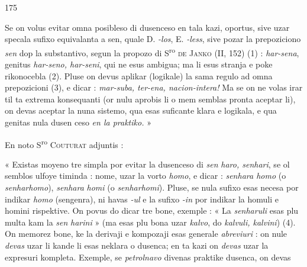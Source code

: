 \begin{VUpage}[179]{175}

Se on volus evitar omna posibleso di dusenceso en tala\nl
kazi, oportus, sive uzar specala sufixo equivalanta a sen,\nl
quale D. \textit{-los}, E. \textit{-less}, sive pozar la prepoziciono \textit{sen} dop la\nl
substantivo, segun la propozo di S\textsuperscript{ro} \textsc{de Janko} (II, 152) (1) :\nl
\textit{har-sena}, genitus \textit{har-seno, har-seni}, qui ne esus ambigua;\nl
ma li esus stranja e poke rikonocebla (2). Pluse on devus\nl
aplikar (logikale) la sama regulo ad omna prepozicioni (3),\nl
e dicar : \textit{mar-suba, ter-ena, nacion-intera!} Ma se on ne volas\nl
irar til ta extrema konsequanti (or nulu aprobis li o mem\nl
semblas pronta aceptar li), on devas aceptar la nuna sistemo,\nl
qua esas suficante klara e logikala, e qua genitas nula dusen\cc
ceso \textit{en la praktiko.} »

En noto S\textsuperscript{ro} \textsc{Couturat} adjuntis :

« Existas moyeno tre simpla por evitar la dusenceso di \textit{sen}\cc
\textit{haro, senhari}, se ol semblos ulfoye timinda : nome, uzar la\nl
vorto \textit{homo}, e dicar : \textit{senhara homo} (o \textit{senharhomo}), \textit{senhara}\nl
\textit{homi} (o \textit{senharhomi}). Pluse, se nula sufixo esas necesa\nl
por indikar \textit{homo} (sengenra), ni havas \textit{-ul} e la sufixo \textit{-in} por\nl
indikar la homuli e homini rispektive. On povus do dicar tre\nl
bone, exemple : « La \textit{senharuli} esas plu multa kam la \textit{sen}\cc
\textit{harini} » (ma esas plu bona uzar \textit{kalvo}, do \textit{kalvuli, kalvini}) (4).\nl
On memorez bone, ke la derivaji e kompozaji esas generale\nl
\textit{abreviuri} : on nule \textit{devas} uzar li kande li esas neklara o\nl
dusenca; en ta kazi on \textit{devas} uzar la expresuri kompleta.\nl
Exemple, se \textit{petrolnavo} divenas praktike dusenca, on devas
\end{VUpage}

